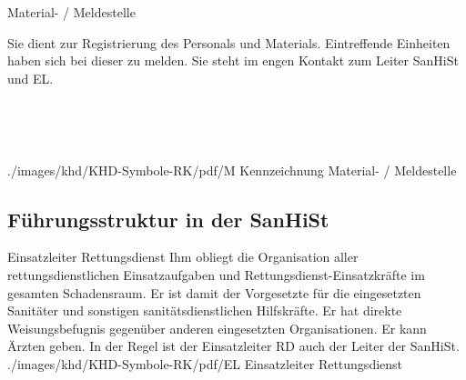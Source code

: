 \TextSlideTeaser
{Material- / Meldestelle}%
{%
Sie dient zur Registrierung des Personals und Materials. 
Eintreffende Einheiten haben sich bei dieser zu melden. Sie
steht im engen Kontakt zum Leiter SanHiSt und EL.

\vspace{1.7cm}
~

~
}%
{\SymbolText}%
{./images/khd/KHD-Symbole-RK/pdf/M}%
{Kennzeichnung Material- / Meldestelle}%
{}%
{}%
{}%






\subsection{Führungsstruktur in der SanHiSt}

\TextSlideTeaser
{Einsatzleiter Rettungsdienst}%
{%
%
%
Ihm obliegt die Organisation aller  rettungsdienstlichen 
Einsatzaufgaben und Rettungsdienst-Einsatzkräfte im gesamten
Schadensraum.
Er ist damit der Vorgesetzte für die eingesetzten Sanitäter und
sonstigen sanitätsdienstlichen Hilfskräfte. Er hat 
direkte Weisungsbefugnis gegenüber anderen eingesetzten
Organisationen. Er kann Ärzten  geben.
In der Regel ist der Einsatzleiter RD auch der Leiter der SanHiSt.
\cite{RkRahmenvorschriftGrossunfaelle2007}
}%
{\SymbolText}%
{./images/khd/KHD-Symbole-RK/pdf/EL}%
{Einsatzleiter Rettungsdienst}%
{}%
{}%
{}%

